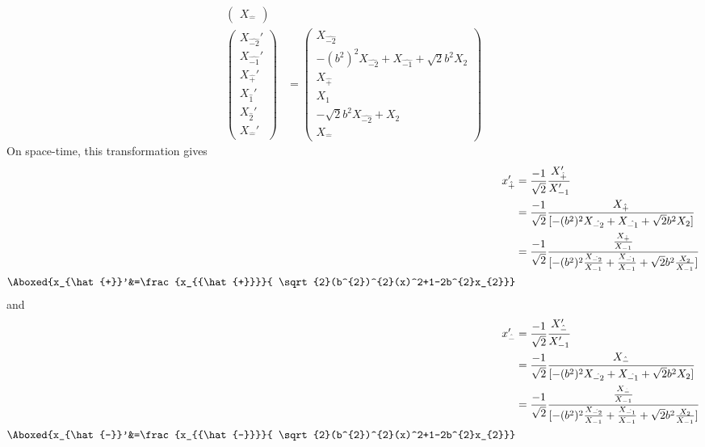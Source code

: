 \documentclass[]{article}
\numberwithin{equation}{section}
\begin{document}
{{\begin{align}
\begin{pmatrix}
    {X}_{\hat{-}}
    \end{pmatrix}\\
    \begin{pmatrix}
    {X}_{\hat{-2}}'\\
    {X}_{\hat{-1}}'\\
    {X}_{\hat{+}}'\\
    {X}_{\hat{1}}'\\
    {X}_{\hat{2}}'\\
    {X}_{\hat{-}}'
    \end{pmatrix}&= \begin{pmatrix}
    {X}_{\hat{-2}}\\
    -(b^{2})^{2}{X}_{\hat{-2}}+{X}_{\hat{-1}}+\sqrt{2}b^{2}{X}_{2}\\
    {X}_{\hat{+}}\\
    {X}_{1}\\
    -\sqrt{2}b^{2} {X}_{\hat{-2}}+{X}_{2}\\
    {X}_{\hat{-}}
    \end{pmatrix}
\end{align}
On space-time, this transformation gives
\begin{align}
    x_{\hat{+}}'&=\frac{-1}{\sqrt{2}}\frac{{X}_{{\hat{+}}}'}{ {X}_{-1}'}\\
   &=\frac{-1}{\sqrt{2}}\frac{{X}_{{\hat{+}}}}{[ -(b^{2})^{2}{X}_{\hat{-2}}+{X}_{\hat{-1}}+\sqrt{2}b^{2}{X}_{2}]}\\
   &=\frac{-1}{\sqrt{2}}\frac{\frac{{X}_{{\hat{+}}}}{{X}_{-1}}}{[ -(b^{2})^{2}\frac{{X}_{\hat{-2}}}{{X}_{-1}}+\frac{{X}_{\hat{-1}}}{{X}_{-1}}+\sqrt{2}b^{2}\frac{{X}_{2}}{{X}_{-1}}]}\\
    \Aboxed{x_{\hat{+}}'&=\frac{x_{{\hat{+}}}}{ \sqrt{2}(b^{2})^{2}(x)^2+1-2b^{2}x_{2}}}
\end{align}
and
\begin{align}
    x_{\hat{-}}'&=\frac{-1}{\sqrt{2}}\frac{{X}_{{\hat{-}}}'}{ {X}_{-1}'}\\
   &=\frac{-1}{\sqrt{2}}\frac{{X}_{{\hat{-}}}}{[ -(b^{2})^{2}{X}_{\hat{-2}}+{X}_{\hat{-1}}+\sqrt{2}b^{2}{X}_{2}]}\\
   &=\frac{-1}{\sqrt{2}}\frac{\frac{{X}_{{\hat{-}}}}{{X}_{-1}}}{[ -(b^{2})^{2}\frac{{X}_{\hat{-2}}}{{X}_{-1}}+\frac{{X}_{\hat{-1}}}{{X}_{-1}}+\sqrt{2}b^{2}\frac{{X}_{2}}{{X}_{-1}}]}\\
    \Aboxed{x_{\hat{-}}'&=\frac{x_{{\hat{-}}}}{ \sqrt{2}(b^{2})^{2}(x)^2+1-2b^{2}x_{2}}}
\end{align}
 \pagebreak
}}
\end{document}
